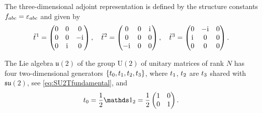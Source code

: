 The three-dimensional adjoint representation is defined by the structure constants $f_{a b c}=\varepsilon_{a b c}$ and given by
\begin{align}
	\suIIta{1}=\begin{pmatrix}0& 0& 0\\0 &0 & -\iu\\0& \iu& 0\end{pmatrix},\quad%
	\suIIta{2}=\begin{pmatrix}0& 0& \iu\\0 &0 & 0\\-\iu& 0 & 0\end{pmatrix},\quad%
	\suIIta{3}=\begin{pmatrix}0&-\iu&0\\ \iu & 0 & 0\\0& 0& 0\end{pmatrix}.\label{eq:su2adjExp}
\end{align}\bigskip

The Lie algebra $\mathfrak{u}(2)$ of the group $\mathrm{U}(2)$ of unitary matrices of rank $N$ has four two-dimensional generators $\{t_{0},t_{1},t_{2},t_{3}\}$, where $t_{1}$, $t_{2}$ are $t_{3}$ shared with $\mathfrak{su}(2)$, see \cref{eq:SU2Tfundamental}, and 
\begin{align}
	\suIIt{0}=\frac{1}{2}\Id_2=\frac{1}{2}\begin{pmatrix}1& 0\\0 &1\end{pmatrix}.
\end{align}
